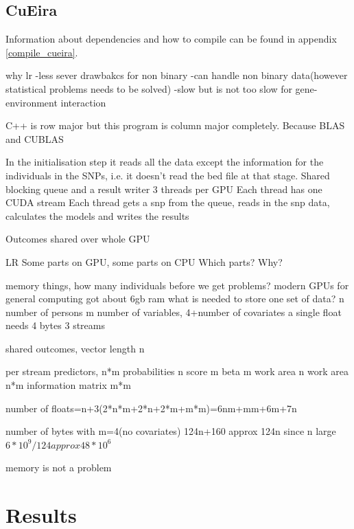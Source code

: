 \documentclass[10pt,a4paper]{report}
\begin{document}


\section{CuEira}

Information about dependencies and how to compile can be found in appendix \ref{compile_cueira}.


why lr
-less sever drawbakcs for non binary
-can handle non binary data(however statistical problems needs to be solved)
-slow but is not too slow for gene-environment interaction

C++ is row major but this program is column major completely. Because BLAS and CUBLAS

In the initialisation step it reads all the data except the information for the individuals in the SNPs, i.e. it doesn't read the bed file at that stage.
Shared blocking queue and a result writer
3 threads per GPU
Each thread has one CUDA stream
Each thread gets a snp from the queue, reads in the snp data, calculates the models and writes the results

Outcomes shared over whole GPU

LR
Some parts on GPU, some parts on CPU
Which parts?
Why?

memory things, how many individuals before we get problems?
modern GPUs for general computing got about 6gb ram\cite{nvtesla}
what is needed to store one set of data?
n number of persons
m number of variables, 4+number of covariates
a single float needs 4 bytes
3 streams

shared
outcomes, vector length n

per stream
predictors, n*m
probabilities n
score m
beta m
work area n
work area n*m
information matrix m*m

number of floats=n+3(2*n*m+2*n+2*m+m*m)=6nm+mm+6m+7n

number of bytes with m=4(no covariates)
124n+160 approx 124n since n large
$6*10^9/124 approx 48*10^6$

memory is not a problem

\chapter{Results}

\end{document}
